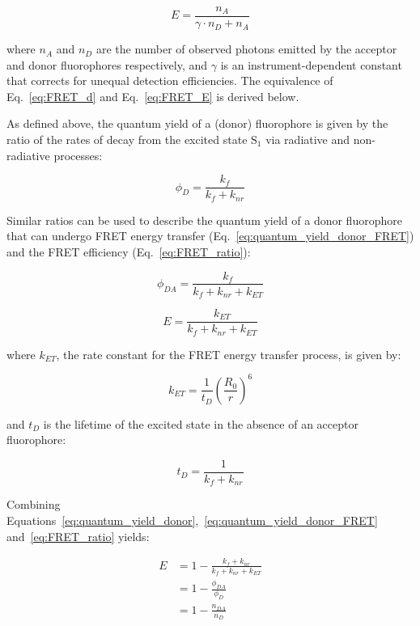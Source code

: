 \begin{equation}
E = \frac{n_A}{\gamma \cdot n_D + n_A}
\label{eq:FRET_E}
\end{equation}

where $n_A$ and $n_D$ are the number of observed photons emitted by the acceptor and donor fluorophores respectively, and $\gamma$ is an instrument-dependent constant that corrects for unequal detection efficiencies. The equivalence of Eq.~\ref{eq:FRET_d} and Eq.~\ref{eq:FRET_E} is derived below.

As defined above, the quantum yield of a (donor) fluorophore is given by the ratio of the rates of decay from the excited state $\text{S}_1$ via radiative and non-radiative processes: 

\begin{equation}
\phi_D = \frac{k_f}{k_f + k_{nr}}
\label{eq:quantum_yield_donor}
\end{equation}

Similar ratios can be used to describe the quantum yield of a donor fluorophore that can undergo FRET energy transfer (Eq.~\ref{eq:quantum_yield_donor_FRET}) and the FRET efficiency (Eq.~\ref{eq:FRET_ratio}):

\begin{equation}
\phi_{DA} = \frac{k_f}{k_f + k_{nr} + k_{ET}}
\label{eq:quantum_yield_donor_FRET}
\end{equation}

\begin{equation}
E = \frac{k_{ET}}{k_f + k_{nr} + k_{ET}}
\label{eq:FRET_ratio}
\end{equation}

where $k_{ET}$, the rate constant for the FRET energy transfer process, is given by:

\begin{equation}
k_{ET} = \frac{1}{t_D} \left(\frac{R_0}{r}\right)^6
\label{eq:k_ET}
\end{equation}

and $t_D$ is the lifetime of the excited state in the absence of an acceptor fluorophore: 

\begin{equation}
t_D = \frac{1}{k_{f} + k_{nr}}
\label{eq:ex_lifetime}
\end{equation}

Combining Equations~\ref{eq:quantum_yield_donor},~\ref{eq:quantum_yield_donor_FRET} and~\ref{eq:FRET_ratio} yields:

\begin{equation}
\begin{split}
E &= 1 - \frac{k_{f} + k_{nr}}{k_f + k_{nr} + k_{ET}} \\ 
&= 1 - \frac{\phi_{DA}}{\phi_{D}} \\
&= 1 - \frac{n_{DA}}{n_{D}}
\label{eq:FRET_ratio_2}
\end{split}
\end{equation}

